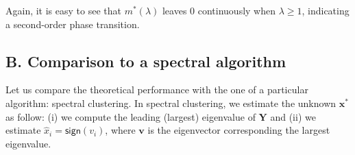 \documentclass[a4paper,oneside,12pt]{article}
\begin{document}
\begin{solution}
\begin{enumerate}[(a)]
\begin{figure}[H]
        \end{figure}
        Again, it is easy to see that $ m^*(\lambda) $ leaves $ 0 $ continuously when $ \lambda \ge 1 $, indicating a second-order phase transition.
\end{enumerate}
\end{solution}


\subsection*{B. Comparison to a spectral algorithm}

Let us compare the theoretical performance with the one of a particular algorithm: spectral clustering. 
In spectral clustering, we estimate the unknown $ \mathbf{x}^* $ as follow: 
(i) we compute the leading (largest) eigenvalue of $ \mathbf{Y} $ and 
(ii) we estimate $ \hat{x}_i = \mathsf{sign}(v_i) $, where $ \mathbf{v} $ is the eigenvector corresponding the largest eigenvalue.
\end{document}
